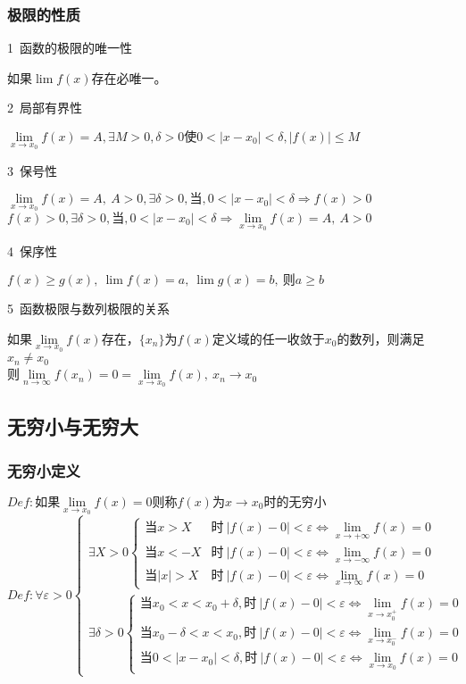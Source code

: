 \subsubsection{极限的性质}
\centerline{1\ 函数的极限的唯一性}
如果$\lim f(x)$存在必唯一。\\
\centerline{2\ 局部有界性}
$\lim\limits_{x\to x_0}f(x)=A,\exists M>0,\delta >0\mbox{使}0<\left|x-x_0\right|<\delta,\left|f(x)\right|\leqslant M$\\
\centerline{3\ 保号性}
$\lim\limits_{x\to x_0}f(x)=A,\ A>0, \exists \delta >0,\mbox{当},0<\left|x-x_0\right|<\delta \Rightarrow f(x)>0$\\
$f(x)>0, \exists \delta >0,\mbox{当},0<\left|x-x_0\right|<\delta \Rightarrow \lim\limits_{x\to x_0}f(x)=A,\ A>0$\\
\centerline{4\ 保序性}
$f(x)\geqslant g(x),\ \lim f(x)=a,\ \lim g(x) = b,\ \mbox{则}a\geqslant b$\\
\centerline{5\ 函数极限与数列极限的关系}
如果$\lim\limits_{x\to x_0}f(x)$存在，$\{x_n\}$为$f(x)$定义域的任一收敛于$x_0$的数列，则满足$x_n\neq x_0$\\
则$\lim\limits_{n\to \infty}f(x_n)=0=\lim\limits_{x\to x_0}f(x),\ x_n\rightarrow x_0$

\subsection{无穷小与无穷大}
\subsubsection{无穷小定义}
$Def:\mbox{如果}\lim\limits_{x\to x_0}f(x)= 0\mbox{则称}f(x)\mbox{为}x\rightarrow x_0\mbox{时的无穷小}$\\
$Def: \forall \varepsilon >0\begin{cases}\exists X>0\begin{cases}
        \mbox{当}x>X&\mbox{时}\ \left|f(x)-0\right|<\varepsilon \Leftrightarrow \lim\limits_{x\to +\infty}f(x)=0\\
        \mbox{当}x<-X&\mbox{时}\ \left|f(x)-0\right|<\varepsilon \Leftrightarrow \lim\limits_{x\to -\infty}f(x)=0\\
        \mbox{当}\left|x\right|>X&\mbox{时}\ \left|f(x)-0\right|<\varepsilon \Leftrightarrow \lim\limits_{x\to \infty}f(x)=0
    \end{cases}\\
    \exists\delta>0\begin{cases}
        \mbox{当}x_0<x<x_0+\delta,\mbox{时}\ \left|f(x)-0\right|<\varepsilon\Leftrightarrow\lim\limits_{x\to x_0^+}f(x)=0\\
        \mbox{当}x_0-\delta<x<x_0 ,\mbox{时}\ \left|f(x)-0\right|<\varepsilon\Leftrightarrow\lim\limits_{x\to x_0^-}f(x)=0\\
        \mbox{当}0<\left|x-x_0\right|<\delta,\mbox{时}\ \left|f(x)-0\right|<\varepsilon\Leftrightarrow\lim\limits_{x\to x_0}f(x)=0
    \end{cases}
\end{cases}$
